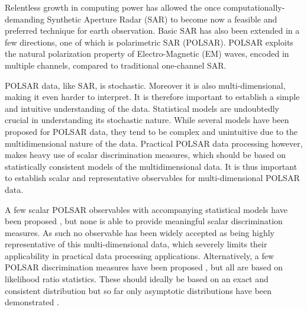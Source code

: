 \documentclass[printer]{tRSL2e}
\begin{document}
Relentless growth in computing power has allowed the once computationally-demanding Synthetic Aperture Radar (SAR)
to become now a feasible and preferred technique for earth observation.
Basic SAR has also been extended in a few directions, one of which is polarimetric SAR (POLSAR).
POLSAR exploits the natural polarization property of Electro-Magnetic (EM) waves,
  encoded in multiple channels, compared to traditional one-channel SAR.
  

POLSAR data, like SAR, is stochastic.
Moreover it is also multi-dimensional, making it even harder to interpret.
It is therefore important to establish a simple and intuitive understanding of the data.
 Statistical models are undoubtedly crucial in understanding its stochastic nature.
While several %
models have been proposed for POLSAR data, they
   tend to be complex and unintuitive due to the multidimensional nature of the data.
Practical POLSAR data processing however, makes heavy use of scalar discrimination measures,
  which should be based on statistically consistent models %
  of the multidimensional data.
It is thus important to establish scalar and representative observables for multi-dimensional POLSAR data.
  

A few scalar POLSAR observables with accompanying statistical models have been proposed \citep{Conradsen_2003_TGRS_4, Alberga_2008_IJRS_4129, Joughin_1994_TGRS_562, Lee_1994_TGRS_1017, Touzi_1996_TGRS_519, Lopez-Martinez_2003_TGRS_2232, Erten_2012_Sensors_2766},
  but none is able to provide meaningful scalar discrimination measures.
As such no observable has been widely accepted as being highly representative of this multi-dimensional data,
  which severely limits their applicability in practical data processing applications.
Alternatively, a few POLSAR discrimination measures have been proposed \citep{Lee_1994_IJRS_2299, Anfinsen_2007_ESA_POLINSAR, Kersten_2005_TGRS_519, Lee_2011_IGARSS_3740, Cao_2007_TGRS_3454, Conradsen_2003_TGRS_4},
  but all are based on likelihood ratio statistics.
These should ideally be based on an exact and consistent distribution
  but so far only asymptotic distributions have been demonstrated \citep{Conradsen_2003_TGRS_4}.
\end{document}
